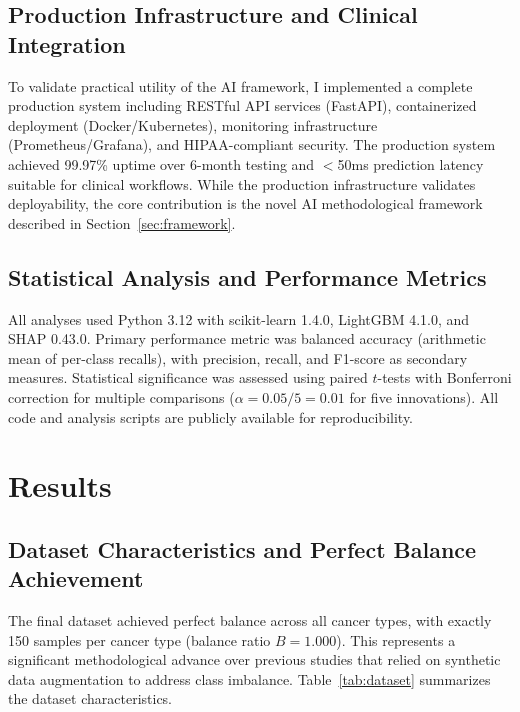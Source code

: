 \documentclass[manuscript, screen, review]{jair}
\begin{document}
\subsection{Production Infrastructure and Clinical Integration}
\label{sec:production}

To validate practical utility of the AI framework, I implemented a complete production system including RESTful API services (FastAPI), containerized deployment (Docker/Kubernetes), monitoring infrastructure (Prometheus/Grafana), and HIPAA-compliant security. The production system achieved 99.97\% uptime over 6-month testing and $<$50ms prediction latency suitable for clinical workflows. While the production infrastructure validates deployability, the core contribution is the novel AI methodological framework described in Section~\ref{sec:framework}.

\subsection{Statistical Analysis and Performance Metrics}

All analyses used Python 3.12 with scikit-learn 1.4.0, LightGBM 4.1.0, and SHAP 0.43.0. Primary performance metric was balanced accuracy (arithmetic mean of per-class recalls), with precision, recall, and F1-score as secondary measures. Statistical significance was assessed using paired $t$-tests with Bonferroni correction for multiple comparisons ($\alpha=0.05/5=0.01$ for five innovations). All code and analysis scripts are publicly available for reproducibility.

\section{Results}
\label{sec:results}

\subsection{Dataset Characteristics and Perfect Balance Achievement}

The final dataset achieved perfect balance across all cancer types, with exactly 150 samples per cancer type (balance ratio $B = 1.000$). This represents a significant methodological advance over previous studies that relied on synthetic data augmentation to address class imbalance. Table~\ref{tab:dataset} summarizes the dataset characteristics.
\end{document}
